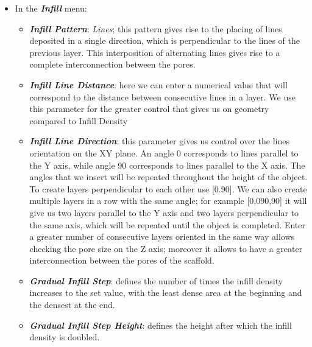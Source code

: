 \begin{itemize}
\item In the \emph{\textbf{Infill}} menu:

\begin{itemize}
\item \textit{\textbf{Infill Pattern}}: \emph{Lines}; this pattern gives rise to the placing of lines deposited in a single direction, which is perpendicular to the lines of the previous layer. This interposition of alternating lines gives rise to a complete interconnection between the pores.\\
\item \emph {\textbf{Infill Line Distance}}: here we can enter a numerical value that will correspond to the distance between consecutive lines in a layer. We use this parameter for the greater control that gives us on geometry compared to Infill Density
\item \emph{\textbf{Infill Line Direction}}: this parameter gives us control over the lines orientation on the XY plane. An angle 0 corresponds to lines parallel to the Y axis, while angle 90 corresponds to lines parallel to the X axis. The angles that we insert will be repeated throughout the height of the object. To create layers perpendicular to each other use [0.90].
We can also create multiple layers in a row with the same angle; for example [0,090,90] it will give us two layers parallel to the Y axis and two layers perpendicular to the same axis, which will be repeated until the object is completed. Enter a greater number of consecutive layers oriented in the same way allows checking the pore size on the Z axis; moreover it allows to have a greater interconnection between the pores of the scaffold.
\item \emph{\textbf{Gradual Infill Step}}: defines the number of times the infill density increases to the set value, with the least dense area at the beginning and the densest at the end.
\item \emph{\textbf{Gradual Infill Step Height}}: defines the height after which the infill density is doubled.
\end{itemize}

\end{itemize}

